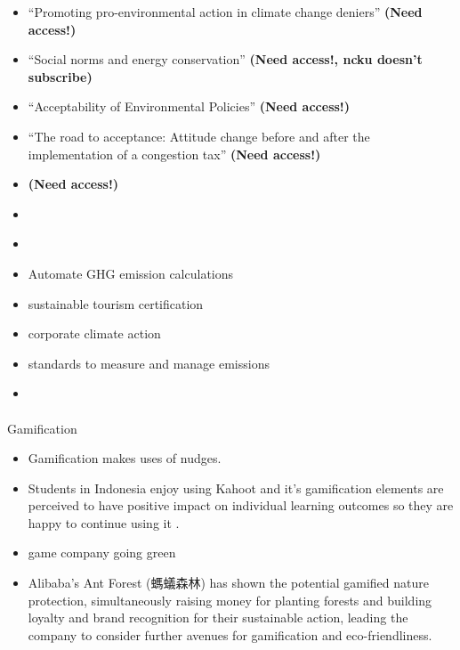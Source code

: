 \documentclass[
  letterpaper,
  DIV=11,
  numbers=noendperiod]{scrartcl}
\makeatletter
\let\oldparagraph\paragraph
\renewcommand{\paragraph}{
    \@ifstar
      \xxxParagraphStar
      \xxxParagraphNoStar
  }
\newcommand{\xxxParagraphStar}[1]{\oldparagraph*{#1}\mbox{}}
\newcommand{\xxxParagraphNoStar}[1]{\oldparagraph{#1}\mbox{}}
\providecommand{\tightlist}{%
  \setlength{\itemsep}{0pt}\setlength{\parskip}{0pt}}\usepackage{longtable,booktabs,array}
\makeatother
\begin{document}
\begin{itemize}
\tightlist
\item
  \citet{bainPromotingProenvironmentalAction2012} ``Promoting
  pro-environmental action in climate change deniers'' \textbf{(Need
  access!)}
\item
  \citet{allcottSocialNormsEnergy2011} ``Social norms and energy
  conservation'' \textbf{(Need access!, ncku doesn't subscribe)}
\item
  \citet{schuitemaAcceptabilityEnvironmentalPolicies2018}
  ``Acceptability of Environmental Policies'' \textbf{(Need access!)}
\item
  \citet{nilssonRoadAcceptanceAttitude2016} ``The road to acceptance:
  Attitude change before and after the implementation of a congestion
  tax'' \textbf{(Need access!)}
\item
  \citet{BERGER2022134716} \textbf{(Need access!)}
\item
  \citet{SupportCleanEnergy2022}
\item
  \citet{UNCTADWorldInvestmentReport2023}
\item
  \citet{climatiqClimatiqCarbonEmissions2023} Automate GHG emission
  calculations
\item
  \citet{earthcheckEarthCheckGoodBusiness2023} sustainable tourism
  certification
\item
  \citet{lfcaLeadersClimateAction2023} corporate climate action
\item
  \citet{greenhousegasprotocolHomepageGHGProtocol2023} standards to
  measure and manage emissions
\item
  \citet{playingfortheplanetalliancePlayingPlanetAnnual2021}
\end{itemize}

\paragraph{Gamification}\label{gamification}

\begin{itemize}
\tightlist
\item
  Gamification makes uses of nudges.
\end{itemize}

\begin{itemize}
\tightlist
\item
  Students in Indonesia enjoy using Kahoot and it's gamification
  elements are perceived to have positive impact on individual learning
  outcomes so they are happy to continue using it
  \citep{wiraniEvaluationContinuedUse2022}.
\item
  \citet{SpaceApeGames} game company going green
\item
  Alibaba's Ant Forest (螞蟻森林) has shown the potential gamified
  nature protection, simultaneously raising money for planting forests
  and building loyalty and brand recognition for their sustainable
  action, leading the company to consider further avenues for
  gamification and eco-friendliness.
\end{itemize}
\end{document}
